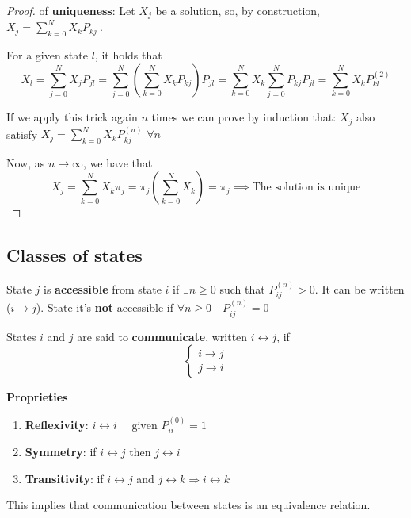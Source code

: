 	\begin{proof} of \textbf{uniqueness}:
		Let $X_j$ be a solution, so, by construction, $X_j = \sum\limits_{k=0}^N X_k P_{kj} ~$.

		For a given state $l$, it holds that
		\begin{equation}
				X_l = \sum\limits_{j=0}^N X_j P_{jl} =  \sum\limits_{j=0}^N \left( \sum\limits_{k=0}^N X_k P_{kj} \right) P_{jl} =  \sum\limits_{k=0}^N X_k \sum\limits_{j=0}^N P_{kj} P_{jl} = \sum\limits_{k=0}^N X_k P_{kl}^{(2)}
		\end{equation}

		If we apply this trick again $n$ times we can prove by induction that:
		$X_j$ also satisfy $ X_j = \sum\limits_{k=0}^N X_k P_{kj}^{(n)} $ \quad  $\forall n $

		Now, as $n \to \infty$, we have that
		\begin{equation}
			X_j = \sum\limits_{k=0}^N X_k \pi_j = \pi_j (\sum\limits_{k=0}^N X_k) = \pi_j  \implies
			\text{The solution is unique}
		\end{equation}
	\end{proof}

\subsection{Classes of states}
	\begin{definition}
		State $j$ is {\bfseries accessible} from state $i$ if $\exists n \geq 0$ such that $P_{ij}^{(n)} > 0$. It can be written ($i \rightarrow j$).
		State it's \textbf{not} accessible if $\forall n \ge 0 \quad P_{ij}^{(n)}=0$
	\end{definition}

	\begin{definition}
		States $i$ and $j$ are said to {\bfseries communicate}, written $ i \leftrightarrow j$, if
		$$\begin{cases}
			i \rightarrow j \\
			j \rightarrow i
		\end{cases}$$
	\end{definition}

	{\bfseries Proprieties}
	\begin{enumerate}
		\item \textbf{Reflexivity}: \quad $i \leftrightarrow i \quad\text{ given } P_{ii}^{(0)}=1$
		\item \textbf{Symmetry}: \quad if $i \leftrightarrow j$ then $j \leftrightarrow i$
		\item \textbf{Transitivity}: \quad if $i \leftrightarrow j$ and $j \leftrightarrow k \Rightarrow i \leftrightarrow k$
	\end{enumerate}
	This implies that communication between states is an equivalence relation.

